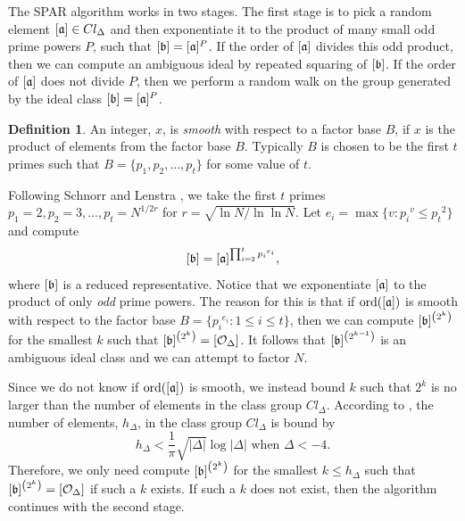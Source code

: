 \documentclass{ucalgthes1}
\theoremstyle{definition}
\newtheorem{defn}[thm]{Definition}
\DeclareMathOperator{\ord}{ord}
\begin{document}
The SPAR algorithm works in two stages. The first stage is to pick a random element $[\mathfrak a] \in Cl_\Delta$ and then exponentiate it to the product of many small odd prime powers $P$, such that $[\mathfrak b] = [\mathfrak a]^P$.  If the order of $[\mathfrak a]$ divides this odd product, then we can compute an ambiguous ideal by repeated squaring of $[\mathfrak b]$.  If the order of $[\mathfrak a]$ does not divide $P$, then we perform a random walk on the group generated by the ideal class $[\mathfrak b] = [\mathfrak a]^P$.

\begin{defn}
An integer, $x$, is \emph{smooth} with respect to a factor base $B$, if $x$ is the product of elements from the factor base $B$.  Typically $B$ is chosen to be the first $t$ primes such that $B = \{p_1, p_2, ..., p_t\}$ for some value of $t$.
\end{defn}

Following Schnorr and Lenstra \cite{Schnorr1984}, we take the first $t$ primes $p_1 = 2, p_2 = 3, ..., p_t = N^{1/2r}$ for $r = \sqrt{\ln N / \ln \ln N}$.  Let $e_i = \max \{ v : {p_i}^v \le {p_t}^2 \}$ and compute
\[
	[\mathfrak b] = [\mathfrak a]^{\prod_{i=2}^t {p_i}^{e_i}},
\]
where $[\mathfrak b]$ is a reduced representative. Notice that we exponentiate $[\mathfrak a]$ to the product of only \emph{odd} prime powers.  The reason for this is that if $\ord(\aclass)$ is smooth with respect to the factor base $B = \{{p_i}^{e_i} : 1 \le i \le t\}$, then we can compute $[\mathfrak b]^{\left(2^k\right)}$ for the smallest $k$ such that $[\mathfrak b]^{\left(2^k\right)} = [\mathcal O_\Delta]$.  It follows that $[\mathfrak b]^{\left(2^{k-1}\right)}$ is an ambiguous ideal class and we can attempt to factor $N$.

Since we do not know if $\ord(\aclass)$ is smooth, we instead bound $k$ such that $2^k$ is no larger than the number of elements in the class group $Cl_\Delta$.  According to \cite[p.155]{Jacobson2009}, the number of elements, $h_\Delta$, in the class group $Cl_\Delta$ is bound by
\[
	h_\Delta < \frac{1}{\pi} \sqrt{|\Delta|}\log{|\Delta|} \textrm{ when } \Delta < -4.
\]
Therefore, we only need compute $[\mathfrak b]^{\left(2^k\right)}$ for the smallest $k \le h_\Delta$ such that $[\mathfrak b]^{\left(2^k\right)} = [\mathcal O_\Delta]$ if such a $k$ exists. If such a $k$ does not exist, then the algorithm continues with the second stage.
\end{document}
